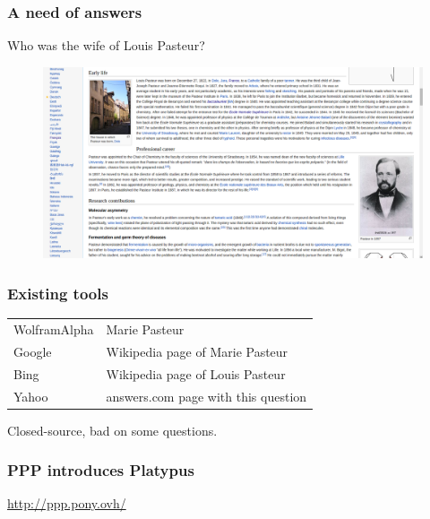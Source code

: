 \begin{frame}[fragile]
    \frametitle{A need of answers}
    Who was the wife of Louis Pasteur?
    \begin{figure}
        \includegraphics[width=\textwidth]{pasteurWiki.png}
    \end{figure}
\end{frame}

\begin{frame}[fragile]
    \frametitle{Existing tools}
    \begin{tabular}{ll}
        WolframAlpha & Marie Pasteur\\
        Google & Wikipedia page of Marie Pasteur\\
        Bing & Wikipedia page of Louis Pasteur\\
        Yahoo & answers.com page with this question
    \end{tabular}
\medbreak
\alert{Closed-source, bad on some questions.}
\end{frame}

\begin{frame}[fragile]
    \frametitle{PPP introduces Platypus}
    \begin{center}
        \url{http://ppp.pony.ovh/}
    \end{center}
\end{frame}
